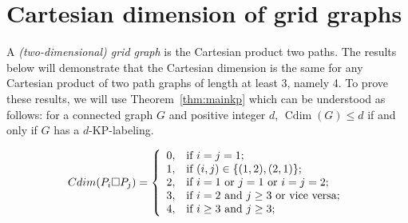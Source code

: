 \documentclass[12pt,a4paper,titlepage,openany]{report}
\DeclareMathOperator{\Cdim}{Cdim}
\begin{document}
\section{Cartesian dimension of grid graphs}

A \emph{(two-dimensional) grid graph} is the Cartesian product two paths. The results below will demonstrate that the Cartesian dimension is the same for any Cartesian product of two path graphs of length at least $3$, namely 4. To prove these results, we will use Theorem~\ref{thm:mainkp} which can be understood as follows: for a connected graph $G$ and positive integer $d$, $\Cdim(G) \leq d$ if and only if $G$ has a $d$-KP-labeling.

\begin{theorem}
\[
	\\Cdim(P_i \Box P_j ) =
		\left\{
			\begin{array}{ll}
				0, & \text{if $i = j =  1$;} \\
				1, & \text{if $(i,j)\in \{(1,2),(2,1)\}$;} \\
				2, & \text{if $i = 1$ or $j = 1$ or $i = j = 2$;}\\
				3, & \text{if $i = 2$ and $j\ge 3$ or vice versa;}\\
				4, & \text{if $i\ge 3$ and $j\ge 3$;}
			\end{array}
		\right.
\]
\end{theorem}
\end{document}
